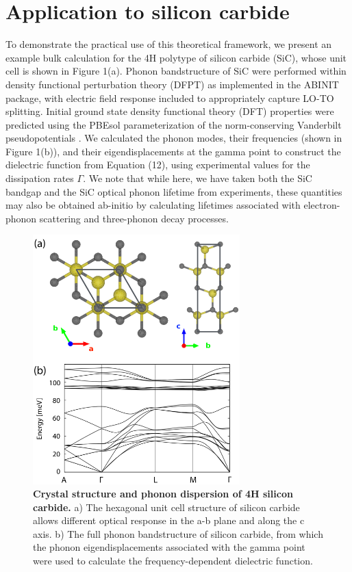 \documentclass[superscriptaddress,reprint,prb]{revtex4-1}
\begin{document}
\section{Application to silicon carbide}
To demonstrate the practical use of this theoretical framework, we present an example bulk calculation for the 4H polytype of silicon carbide (SiC), whose unit cell is shown in Figure 1(a).  %
Phonon bandstructure of SiC were performed within density functional perturbation
theory (DFPT) as implemented in the ABINIT package\cite{abinit1,abinit2,abinit3,Gonze1997dynamical,Hamann2005metric}, with electric field response included to appropriately capture LO-TO splitting. Initial ground state density functional theory (DFT) properties were predicted using the PBEsol parameterization of the norm-conserving Vanderbilt pseudopotentials \cite{PBEsol,ONCV_PPs,pseudodojo}. We calculated the phonon modes, their frequencies (shown in Figure 1(b)), and their eigendisplacements at the gamma point to construct the dielectric function from Equation (12), using experimental values for the dissipation rates $\Gamma$. We note that while here, we have taken both the SiC bandgap and the SiC optical phonon lifetime from experiments, these quantities may also be obtained ab-initio by calculating lifetimes associated with electron-phonon scattering and three-phonon decay processes. 

\begin{figure}[t]
\includegraphics[width=8cm]{structure.png}
\caption{\textbf{Crystal structure and phonon dispersion of 4H silicon carbide.} a) The hexagonal unit cell structure of silicon carbide allows different optical response in the a-b plane and along the c axis. b) The full phonon bandstructure of silicon carbide, from which the phonon eigendisplacements associated with the gamma point were used to calculate the frequency-dependent dielectric function.}
\label{fig:phonons}
\end{figure}
\end{document}
